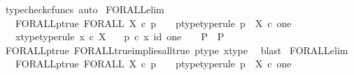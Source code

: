 \begin{isabellebody}
\ {\isacharparenleft}{\kern0pt}typecheck{\isacharunderscore}{\kern0pt}cfuncs{\isacharcomma}{\kern0pt}\ auto{\isacharparenright}{\kern0pt}%
\endisatagproof
{\isafoldproof}%
%
\isadelimproof
\isanewline
%
\endisadelimproof
\isanewline
{}\isamarkupfalse%
\ FORALL{\isacharunderscore}{\kern0pt}elim{\isacharcolon}{\kern0pt}\isanewline
\ \ \ FORALL{\isacharunderscore}{\kern0pt}p{\isacharunderscore}{\kern0pt}true{\isacharcolon}{\kern0pt}\ {\isachardoublequoteopen}FORALL\ X\ {\isasymcirc}\isactrlsub c\ p\isactrlsup {\isasymsharp}\ {\isacharequal}{\kern0pt}\ {\isasymt}{\isachardoublequoteclose}\ \ p{\isacharunderscore}{\kern0pt}type{\isacharbrackleft}{\kern0pt}type{\isacharunderscore}{\kern0pt}rule{\isacharbrackright}{\kern0pt}{\isacharcolon}{\kern0pt}\ {\isachardoublequoteopen}p\ {\isacharcolon}{\kern0pt}\ X\ {\isasymtimes}\isactrlsub c\ one\ {\isasymrightarrow}\ {\isasymOmega}{\isachardoublequoteclose}\isanewline
\ \ \ x{\isacharunderscore}{\kern0pt}type{\isacharbrackleft}{\kern0pt}type{\isacharunderscore}{\kern0pt}rule{\isacharbrackright}{\kern0pt}{\isacharcolon}{\kern0pt}\ {\isachardoublequoteopen}x\ {\isasymin}\isactrlsub c\ X{\isachardoublequoteclose}\isanewline
\ \ \ {\isachardoublequoteopen}{\isacharparenleft}{\kern0pt}p\ {\isasymcirc}\isactrlsub c\ {\isasymlangle}x{\isacharcomma}{\kern0pt}\ id\ one{\isasymrangle}\ {\isacharequal}{\kern0pt}\ {\isasymt}\ {\isasymLongrightarrow}\ P{\isacharparenright}{\kern0pt}\ {\isasymLongrightarrow}\ P{\isachardoublequoteclose}\isanewline
%
\isadelimproof
\ \ %
\endisadelimproof
%
\isatagproof
{}\isamarkupfalse%
\ FORALL{\isacharunderscore}{\kern0pt}p{\isacharunderscore}{\kern0pt}true\ FORALL{\isacharunderscore}{\kern0pt}true{\isacharunderscore}{\kern0pt}implies{\isacharunderscore}{\kern0pt}all{\isacharunderscore}{\kern0pt}true{}\ p{\isacharunderscore}{\kern0pt}type\ x{\isacharunderscore}{\kern0pt}type\ \isamarkupfalse%
\ blast%
\endisatagproof
{\isafoldproof}%
%
\isadelimproof
\isanewline
%
\endisadelimproof
\isanewline
{}\isamarkupfalse%
\ FORALL{\isacharunderscore}{\kern0pt}elim{\isacharprime}{\kern0pt}{\isacharcolon}{\kern0pt}\isanewline
\ \ \ FORALL{\isacharunderscore}{\kern0pt}p{\isacharunderscore}{\kern0pt}true{\isacharcolon}{\kern0pt}\ {\isachardoublequoteopen}FORALL\ X\ {\isasymcirc}\isactrlsub c\ p\isactrlsup {\isasymsharp}\ {\isacharequal}{\kern0pt}\ {\isasymt}{\isachardoublequoteclose}\ \ p{\isacharunderscore}{\kern0pt}type{\isacharbrackleft}{\kern0pt}type{\isacharunderscore}{\kern0pt}rule{\isacharbrackright}{\kern0pt}{\isacharcolon}{\kern0pt}\ {\isachardoublequoteopen}p\ {\isacharcolon}{\kern0pt}\ X\ {\isasymtimes}\isactrlsub c\ one\ {\isasymrightarrow}\ {\isasymOmega}{\isachardoublequoteclose}\isanewline

\end{isabellebody}
